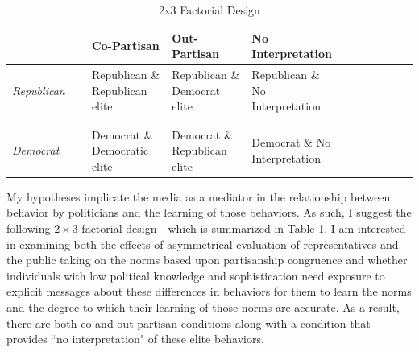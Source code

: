 \documentclass [12pt]{article}
\begin{document}
\begin{table}[hbt!]
	\caption{2x3 Factorial Design}
	\begin{tabular}{p{0.2\linewidth}p{0.2\linewidth}p{0.2\linewidth}p{0.2\linewidth}p{0.2\linewidth}}
		\textbf{} & \textbf{Co-Partisan} & \textbf{Out-Partisan} & \textbf{No Interpretation}\\
		\midrule
		\textit{Republican} & Republican \& Republican elite & Republican \& Democrat elite & Republican \& No Interpretation \\ [1ex]
		\\
		\hdashline 
		\\ 
		\textit{Democrat} & Democrat \& Democratic elite & Democrat \& Republican elite & Democrat \& No Interpretation \\
		\hline
	\end{tabular}
	\label{tab:experiment_design}
\end{table}\textbf{}

My hypotheses implicate the media as a mediator in the relationship between behavior by politicians and the learning of those behaviors. As such, I suggest the following $2\times3$ factorial design - which is summarized in Table \ref{tab:experiment_design}. I am interested in examining both the effects of asymmetrical evaluation of representatives and the public taking on the norms based upon partisanship congruence and whether individuals with low political knowledge and sophistication need exposure to explicit messages about these differences in behaviors for them to learn the norms and the degree to which their learning of those norms are accurate. As a result, there are  both co-and-out-partisan conditions along with a condition that provides ``no interpretation" of these elite behaviors.
 
\end{document}
